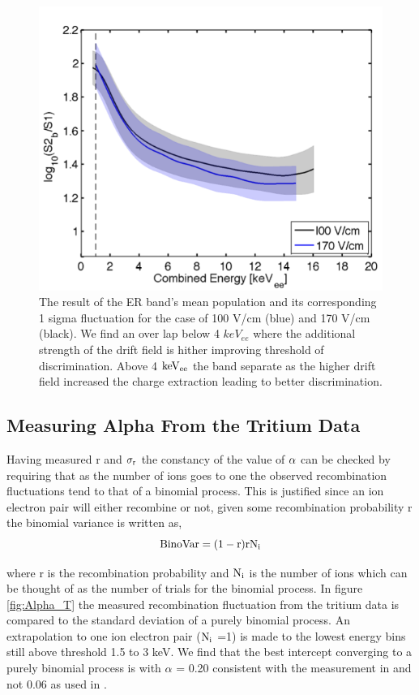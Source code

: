 \begin{figure}[h!]\centering
\includegraphics[width=120mm]{Chapter_Flucs/Figures/Iter1_100/Band_comp.png}
\caption{The result of the ER band's mean population and its corresponding 1 sigma fluctuation for the case of 100 V/cm (blue) and 170 V/cm (black). We find an over lap below 4 $keV_{ee}$ where the additional strength of the drift field is hither improving threshold of discrimination. Above 4 $\rm keV_{ee}$ the band separate as the higher drift field increased the charge extraction leading to better discrimination.}
\label{fig:ER_Band_Calc}
\end{figure}


\subsection{Measuring Alpha From the Tritium Data}

Having measured r and $\rm \sigma_r$ the constancy of the value of $\rm \alpha$ can be checked by requiring that as the number of ions goes to one the observed recombination fluctuations tend to that of a binomial process. This is justified since an ion electron pair will either recombine or not, given some recombination probability r the binomial variance is written as,
\begin{equation}
\rm BinoVar= (1-r)rN_i
\label{eq:Bino_Var}
\end{equation}

\noindent where r is the recombination probability and $\rm N_i$ is the number of ions which can be thought of as the number of trials for the binomial process. In figure \ref{fig:Alpha_T} the measured recombination fluctuation from the tritium data is compared to the standard deviation of a purely binomial process. An extrapolation to one ion electron pair ($\rm N_i$ =1) is made to the lowest energy bins still above threshold 1.5 to 3 keV. We find that the best intercept converging to a purely binomial process is with $\alpha$ = 0.20 consistent with the measurement in \cite{Doke_alpha} and not 0.06 as used in \cite{Dahl_Thesis}.

